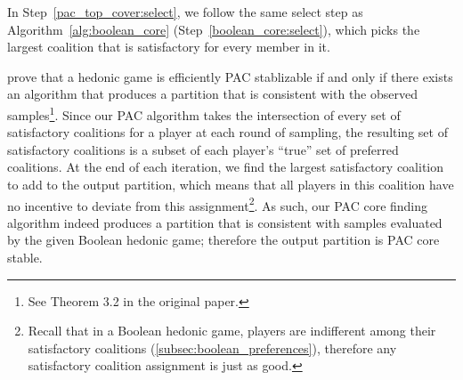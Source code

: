 In Step~\ref{pac_top_cover:select}, we follow the same select step as
Algorithm~\ref{alg:boolean_core} (Step~\ref{boolean_core:select}), which picks
the largest coalition that is satisfactory for every member in it.

 prove that a hedonic game is efficiently PAC
stablizable if and only if there exists an algorithm that produces a partition
that is consistent with the observed samples\footnote{See Theorem 3.2 in the
original paper.}.
Since our PAC algorithm takes the intersection of every set of satisfactory
coalitions for a player at each round of sampling, the resulting set of
satisfactory coalitions is a subset of each player's ``true'' set of preferred
coalitions.
At the end of each iteration, we find the largest satisfactory coalition
to add to the output partition, which means that all players in this coalition
have no incentive to deviate from this assignment\footnote{Recall that in a
Boolean hedonic game, players are indifferent among their satisfactory
coalitions (\autoref{subsec:boolean_preferences}), therefore any satisfactory
coalition assignment is just as good.}.
As such, our PAC core finding algorithm indeed produces a partition that is
consistent with samples evaluated by the given Boolean hedonic game; therefore
the output partition is PAC core stable.
